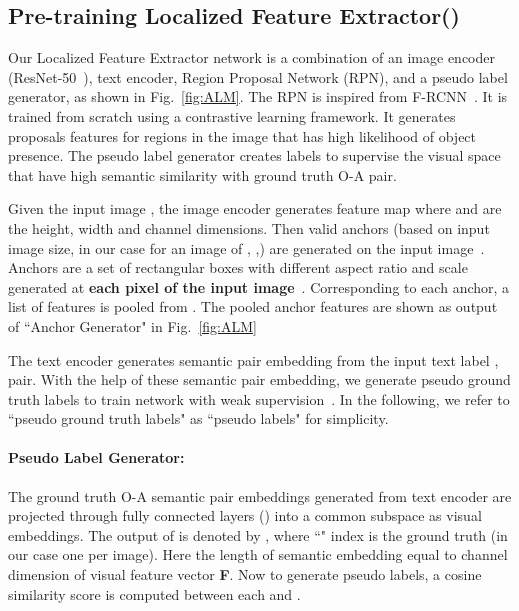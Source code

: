 \documentclass{bmvc2k}
\begin{document}
\vspace{-0.3cm}
\subsection{Pre-training Localized Feature Extractor()}\label{section:LFE}
\vspace{-0.2cm}
Our Localized Feature Extractor network  is a combination of an image encoder (ResNet-50~\cite{he2016deep}), text encoder, Region Proposal Network (RPN), and a pseudo label generator, as shown in Fig.~\ref{fig:ALM}. 
The RPN is inspired from F-RCNN~\cite{ren2015faster}. It is trained from scratch using a contrastive learning framework.
It generates proposals features for regions in the image that has high likelihood of object presence.
The pseudo label generator creates labels to supervise the visual space that have high semantic similarity with ground truth O-A pair.


Given the input image , the image encoder generates feature map  where  and  are the height, width and channel dimensions. Then  valid anchors (based on input image size, in our case for an image of , ,) are generated on the input image~\cite{ren2015faster}. Anchors are a set of rectangular boxes with different aspect ratio and scale generated at \textbf{each pixel of the input image}~\cite{ren2015faster}. Corresponding to each anchor, a list of features is pooled from . The pooled anchor features are  shown as output of ``Anchor Generator" in Fig.~\ref{fig:ALM}

The text encoder generates semantic pair embedding from the input text label ,  pair. With the help of these semantic pair embedding, we generate pseudo ground truth labels to train  network with weak supervision~\cite{tian2019contrastive}. In the following, we refer to ``pseudo ground truth labels" as ``pseudo labels" for simplicity.

\vspace{-0.35cm}
\paragraph{Pseudo Label Generator:} The ground truth O-A semantic pair embeddings generated from text encoder are projected through fully connected layers () into a common subspace as visual embeddings. The output of  is denoted by , where ``" index is the ground truth (in our case one per image). Here the length  of semantic embedding equal to channel dimension  of visual feature vector \textbf{F}. Now to generate pseudo labels, a cosine similarity score is computed between each  and .
\end{document}
